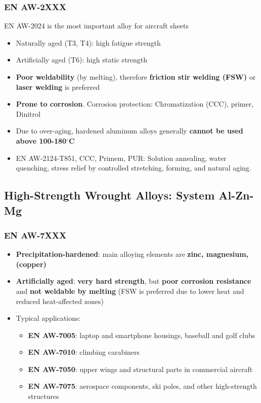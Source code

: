 \documentclass{article}
\begin{document}
\subsubsection{EN AW-2XXX}
EN AW-2024 is the most important alloy for aircraft sheets
\begin{itemize}
  \item Naturally aged (T3, T4): high fatigue strength
  \item Artificially aged (T6): high static strength
  \item \textbf{Poor weldability} (by melting), therefore \textbf{friction stir welding (FSW)} or \textbf{laser welding} is preferred
  \item \textbf{Prone to corrosion}. Corrosion protection: Chromatization (CCC), primer, Dinitrol
  \item Due to over-aging, hardened aluminum alloys generally \textbf{cannot be used above 100-180$^\circ$C}
  \item EN AW-2124-T851, CCC, Primem, PUR: Solution annealing, water quenching, stress relief by controlled stretching, forming, and natural aging.
\end{itemize}

\subsection{High-Strength Wrought Alloys: System Al-Zn-Mg}
\subsubsection{EN AW-7XXX}
\begin{itemize}
  \item \textbf{Precipitation-hardened}: main alloying elements are \textbf{zinc, magnesium, (copper)}
  \item \textbf{Artificially aged}: \textbf{very hard strength}, but \textbf{poor corrosion resistance} and \textbf{not weldable by melting} (FSW is preferred due to lower heat and reduced heat-affected zones)
  \item Typical applications:
  \begin{itemize}
    \item \textbf{EN AW-7005}: laptop and smartphone housings, baseball and golf clubs
    \item \textbf{EN AW-7010}: climbing carabiners
    \item \textbf{EN AW-7050}: upper wings and structural parts in commercial aircraft
    \item \textbf{EN AW-7075}: aerospace components, ski poles, and other high-strength structures
  \end{itemize}
\end{itemize}
\end{document}
